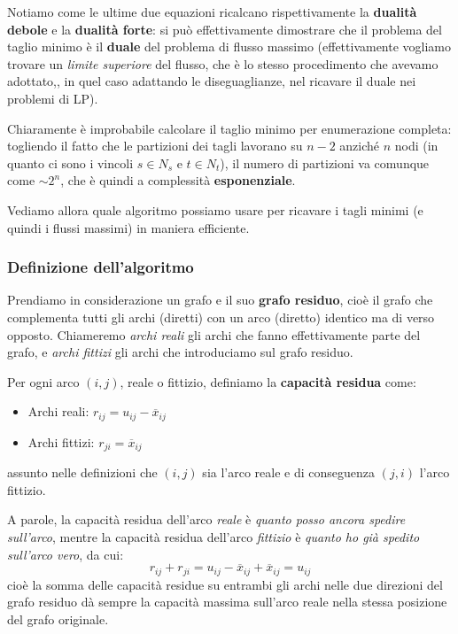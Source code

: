 \documentclass[a4paper,11pt]{article}
\begin{document}
Notiamo come le ultime due equazioni ricalcano rispettivamente la \textbf{dualità debole} e la \textbf{dualità forte}: si può effettivamente dimostrare che il problema del taglio minimo è il \textbf{duale} del problema di flusso massimo (effettivamente vogliamo trovare un \textit{limite superiore} del flusso, che è lo stesso procedimento che avevamo adottato,, in quel caso adattando le diseguaglianze, nel ricavare il duale nei problemi di LP).

Chiaramente è improbabile calcolare il taglio minimo per enumerazione completa: togliendo il fatto che le partizioni dei tagli lavorano su $n-2$ anziché $n$ nodi (in quanto ci sono i vincoli $s \in N_s$ e $t \in N_t$), il numero di partizioni va comunque come $\sim 2^n$, che è quindi a complessità \textbf{esponenziale}.

Vediamo allora quale algoritmo possiamo usare per ricavare i tagli minimi (e quindi i flussi massimi) in maniera efficiente.

\subsubsection{Definizione dell'algoritmo}
Prendiamo in considerazione un grafo e il suo \textbf{grafo residuo}, cioè il grafo che complementa tutti gli archi (diretti) con un arco (diretto) identico ma di verso opposto. 
Chiameremo \textit{archi reali} gli archi che fanno effettivamente parte del grafo, e \textit{archi fittizi} gli archi che introduciamo sul grafo residuo. 

Per ogni arco $(i,j)$, reale o fittizio, definiamo la \textbf{capacità residua} come:
\begin{itemize}
	\item Archi reali: $r_{ij} = u_{ij} - \overline{x}_{ij}$
	\item Archi fittizi: $r_{ji} = \overline{x}_{ij}$
\end{itemize}
assunto nelle definizioni che $(i, j)$ sia l'arco reale e di conseguenza $(j, i)$ l'arco fittizio.

A parole, la capacità residua dell'arco \textit{reale} è \textit{quanto posso ancora spedire sull'arco}, mentre la capacità residua dell'arco \textit{fittizio} è \textit{quanto ho già spedito sull'arco vero}, da cui:
$$
r_{ij} + r_{ji} = u_{ij} - \overline{x}_{ij} + \overline{x}_{ij} = u_{ij}
$$
cioè la somma delle capacità residue su entrambi gli archi nelle due direzioni del grafo residuo dà sempre la capacità massima sull'arco reale nella stessa posizione del grafo originale.
\end{document}
